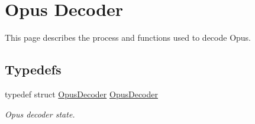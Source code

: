 \hypertarget{group__opus__decoder}{
\section{Opus Decoder}
\label{group__opus__decoder}
}


This page describes the process and functions used to decode Opus.  
\subsection*{Typedefs}
\begin{DoxyCompactItemize}
\item 
typedef struct \hyperlink{group__opus__decoder_ga401d8579958d36094715a6b90cd159a6}{OpusDecoder} \hyperlink{group__opus__decoder_ga401d8579958d36094715a6b90cd159a6}{OpusDecoder}
\begin{DoxyCompactList}\small\item\em Opus decoder state. \item\end{DoxyCompactList}\end{DoxyCompactItemize}
